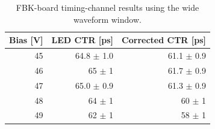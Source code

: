 \begin{table}[htbp]
\centering
\small
\begin{tabular}{rrr}
\toprule
Bias [V] & LED CTR [ps] & Corrected CTR [ps] \\
\midrule
45 & 64.8 $\pm$ 1.0 & 61.1 $\pm$ 0.9 \\
46 & 65 $\pm$ 1 & 61.7 $\pm$ 0.9 \\
47 & 65.0 $\pm$ 0.9 & 61.3 $\pm$ 0.9 \\
48 & 64 $\pm$ 1 & 60 $\pm$ 1 \\
49 & 62 $\pm$ 1 & 58 $\pm$ 1 \\
\bottomrule
\end{tabular}
\caption{FBK-board timing-channel results using the wide waveform window.}
\label{tab:fbk-timing-wide}
\end{table}
